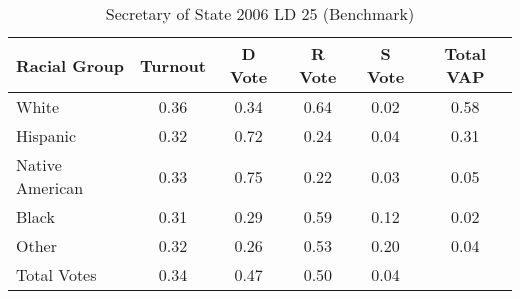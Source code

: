 \begin{table}[htb]
\begin{center}
\caption{Secretary of State 2006 LD 25 (Benchmark)}
\label{sos06_vap_ld_25_benchmark}
\begin{tabular}{lccccc}
  \hline
Racial Group & Turnout & D Vote & R Vote & S Vote & Total VAP \\ 
  \hline
White & 0.36 & 0.34 & 0.64 & 0.02 & 0.58 \\ 
  Hispanic & 0.32 & 0.72 & 0.24 & 0.04 & 0.31 \\ 
  Native American & 0.33 & 0.75 & 0.22 & 0.03 & 0.05 \\ 
  Black & 0.31 & 0.29 & 0.59 & 0.12 & 0.02 \\ 
  Other & 0.32 & 0.26 & 0.53 & 0.20 & 0.04 \\ 
  Total Votes & 0.34 & 0.47 & 0.50 & 0.04 &  \\ 
   \hline
\end{tabular}
\end{center}
\end{table}
